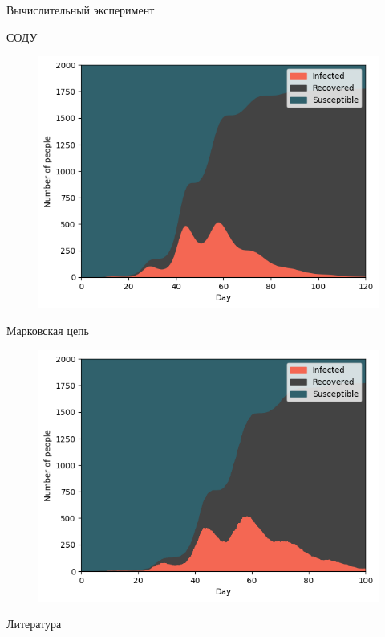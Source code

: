\documentclass[aspectratio=169]{beamer}
\begin{document}
\begin{frame}{Вычислительный эксперимент}
\begin{center}
    \begin{minipage}[t]{0.47\columnwidth}
        \begin{center}
            СОДУ
        \end{center}
        \vspace{-0.5cm}
		\begin{figure}
			\centering
			\includegraphics[width=\linewidth]{slides/sir_3waves.png}
		\end{figure}
	\end{minipage}
	\begin{minipage}[t]{0.47\columnwidth}
        \begin{center}
            Марковская цепь
        \end{center}
        \vspace{-0.5cm}
		\begin{figure}
			\centering
			\includegraphics[width=\linewidth]{slides/stochastic_3waves.png}
		\end{figure}
	\end{minipage}
\end{center}
\end{frame}


\begin{frame}[noframenumbering]{Литература}
\nocite{*}
\printbibliography
\end{frame}
\end{document}

